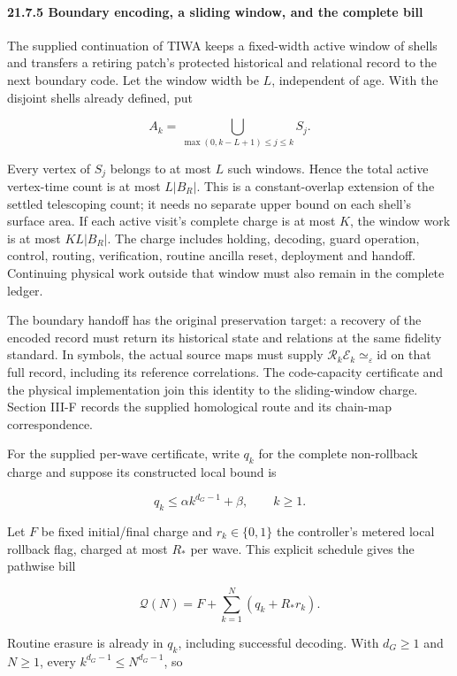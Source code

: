 \documentclass[
]{article}
\begin{document}
\paragraph{21.7.5 Boundary encoding, a sliding window, and the complete
bill}\label{boundary-encoding-a-sliding-window-and-the-complete-bill}

The supplied continuation of TIWA keeps a fixed-width active window of
shells and transfers a retiring patch's protected historical and
relational record to the next boundary code. Let the window width be
\(L\), independent of age. With the disjoint shells already defined, put

\[
A_k=\bigcup_{\max(0,k-L+1)\le j\le k}S_j.
\]

Every vertex of \(S_j\) belongs to at most \(L\) such windows. Hence the
total active vertex-time count is at most \(L|B_R|\). This is a
constant-overlap extension of the settled telescoping count; it needs no
separate upper bound on each shell's surface area. If each active
visit's complete charge is at most \(K\), the window work is at most
\(KL|B_R|\). The charge includes holding, decoding, guard operation,
control, routing, verification, routine ancilla reset, deployment and
handoff. Continuing physical work outside that window must also remain
in the complete ledger.

The boundary handoff has the original preservation target: a recovery of
the encoded record must return its historical state and relations at the
same fidelity standard. In symbols, the actual source maps must supply
\(\mathcal R_k\mathcal E_k\simeq_\varepsilon\mathrm{id}\) on that full
record, including its reference correlations. The code-capacity
certificate and the physical implementation join this identity to the
sliding-window charge. Section III-F records the supplied homological
route and its chain-map correspondence.

For the supplied per-wave certificate, write \(q_k\) for the complete
non-rollback charge and suppose its constructed local bound is

\[
q_k\le\alpha k^{d_G-1}+\beta,\qquad k\ge1.
\]

Let \(F\) be fixed initial/final charge and \(r_k\in\{0,1\}\) the
controller's metered local rollback flag, charged at most \(R_*\) per
wave. This explicit schedule gives the pathwise bill

\[
\mathcal Q(N)=F+\sum_{k=1}^{N}(q_k+R_*r_k).
\]

Routine erasure is already in \(q_k\), including successful decoding.
With \(d_G\ge1\) and \(N\ge1\), every \(k^{d_G-1}\le N^{d_G-1}\), so
\end{document}
